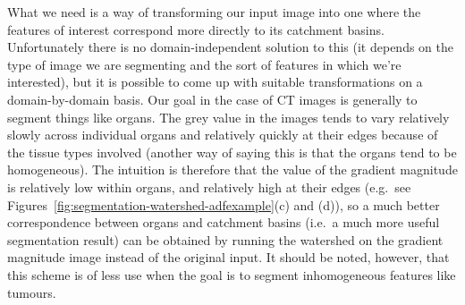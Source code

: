 What we need is a way of transforming our input image into one where the features of interest correspond more directly to its catchment basins. Unfortunately there is no domain-independent solution to this (it depends on the type of image we are segmenting and the sort of features in which we're interested), but it is possible to come up with suitable transformations on a domain-by-domain basis. Our goal in the case of CT images is generally to segment things like organs. The grey value in the images tends to vary relatively slowly across individual organs and relatively quickly at their edges because of the tissue types involved (another way of saying this is that the organs tend to be homogeneous). The intuition is therefore that the value of the gradient magnitude is relatively low within organs, and relatively high at their edges (e.g.~see Figures~\ref{fig:segmentation-watershed-adfexample}(c) and (d)), so a much better correspondence between organs and catchment basins (i.e.~a much more useful segmentation result) can be obtained by running the watershed on the gradient magnitude image instead of the original input. It should be noted, however, that this scheme is of less use when the goal is to segment inhomogeneous features like tumours.


